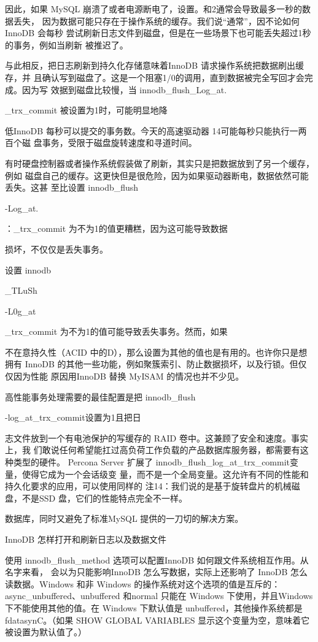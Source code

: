 因此，如果 MySQL 崩溃了或者电源断电了，设置。和2通常会导致最多一秒的数据丢失，
因为数据可能只存在于操作系统的缓存。我们说“通常”，因不论如何 InnoDB 会每秒
尝试刷新日志文件到磁盘，但是在一些场景下也可能丢失超过1秒的事务，例如当刷新
被推迟了。

与此相反，把日志刷新到持久化存储意味着InnoDB 请求操作系统把数据刷出缓存，并
且确认写到磁盘了。这是一个阻塞1/0的调用，直到数据被完全写回才会完成。因为写
效据到磁盘比较慢，当 innodb\_flush\_Log\_at.

\_trx\_commit 被设置为1时，可能明显地降

低InnoDB 每秒可以提交的事务数。今天的高速驱动器 14可能每秒只能执行一两百个磁
盘事务，受限于磁盘旋转速度和寻道时间。

有时硬盘控制器或者操作系统假装做了刷新，其实只是把数据放到了另一个缓存，例如
磁盘自己的缓存。这更快但是很危险，因为如果驱动器断电，数据依然可能丢失。这甚
至比设置 innodb\_flush

-Log\_at.

：\_trx\_commit 为不为1的值更糟糕，因为这可能导致数据

损坏，不仅仅是丢失事务。

设置 innodb

\_TLuSh

-L0g\_at

\_trx\_commit 为不为1的值可能导致丢失事务。然而，如果

不在意持久性（ACID 中的D），那么设置为其他的值也是有用的。也许你只是想拥有
InnoDB 的其他一些功能，例如聚簇索引、防止数据损坏，以及行锁。但仅仅因为性能
原因用InnoDB 替换 MyISAM 的情况也并不少见。

高性能事务处理需要的最佳配置是把 innodb\_flush

-log\_at\_trx\_commit设置为1且把日

志文件放到一个有电池保护的写缓存的 RAID 卷中。这兼顾了安全和速度。事实上，我
们敢说任何希望能扛过高负荷工作负载的产品数据库服务器，都需要有这种类型的硬件。
Percona Server 扩展了 innodb\_flush\_log\_at\_trx\_commit变量，使得它成为一个会话级变
量，而不是一个全局变量。这允许有不同的性能和持久化要求的应用，可以使用同样的
注14：我们说的是基于旋转盘片的机械磁盘，不是SSD 盘，它们的性能特点完全不一样。

数据库，同时又避免了标准MySQL 提供的一刀切的解决方案。

InnoDB 怎样打开和刷新日志以及数据文件

使用 innodb\_flush\_method 选项可以配置InnoDB 如何跟文件系统相互作用。从名字来看，
会以为只能影响InnoDB 怎么写数据，实际上还影响了 InnoDB 怎么读数据。Windows
和非 Windows 的操作系统对这个选项的值是互斥的：async\_unbuffered、unbuffered
和normal 只能在 Windows 下使用，并且Windows 下不能使用其他的值。在 Windows
下默认值是 unbuffered，其他操作系统都是 fdatasynC。（如果 SHOW GLOBAL VARIABLES
显示这个变量为空，意味着它被设置为默认值了。）

